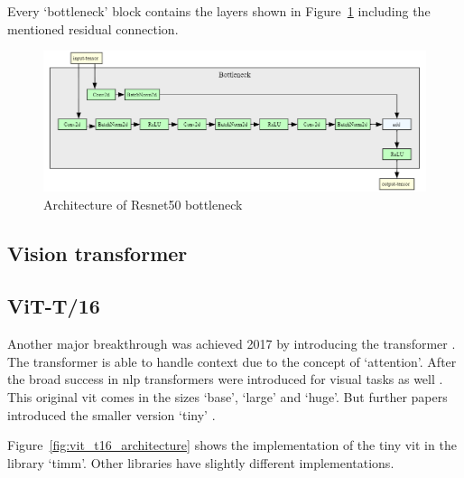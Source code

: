 Every `bottleneck' block contains the layers shown in Figure~\ref{fig:resnet50_architecture_bottleneck} including the mentioned residual connection.

\begin{figure}[H]
    \begin{center}
    \includegraphics[width=15cm]{../images/resnet50_architecture_bottleneck.png}
    \caption{Architecture of Resnet50 bottleneck}\label{fig:resnet50_architecture_bottleneck}
    \end{center}
\end{figure}

\subsection{Vision transformer}

\subsection{ViT-T/16}
Another major breakthrough was achieved 2017 by introducing the transformer \autocite{vaswani2017}. The transformer is able to handle context due to the concept of `attention'. After the broad success in \gls{nlp} transformers were introduced for visual tasks as well \autocite{dosovitskiy2020}. This original \gls{vit} comes in the sizes `base', `large' and `huge'. But further papers introduced the smaller version `tiny' \autocite{liu2021,wu2022}.

Figure~\ref{fig:vit_t16_architecture} shows the implementation of the tiny \gls{vit} in the library `timm'. Other libraries have slightly different implementations.

